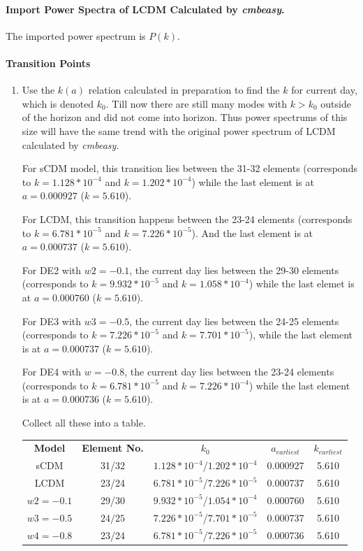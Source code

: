 \documentclass{article}
\begin{document}
\paragraph{Import Power Spectra of LCDM Calculated by {\it cmbeasy}.}

The imported power spectrum is $P(k)$.

\paragraph{Transition Points}
\begin{enumerate}
\item
Use the $k(a)$ relation calculated in preparation to find the $k$ for current day, which is denoted $k_0$. Till now there are still many modes with $k>k_0$ outside of the horizon and did not come into horizon. Thus power spectrums of this size will have the same trend with the original power spectrum of LCDM calculated by {\it cmbeasy}.

For sCDM model, this transition lies between the 31-32 elements (corresponds to $k=1.128*10^{-4}$ and $k=1.202*10^{-4}$) while the last element is at $a=0.000927$ ($k=5.610$).

For LCDM, this transition happens between the 23-24 elements (corresponds to $k=6.781*10^{-5}$ and $k=7.226*10^{-5}$). And the last element is at $a=0.000737$ ($k=5.610$).

For DE2 with $w2=-0.1$, the current day lies between the 29-30 elements (corresponds to $k=9.932*10^{-5}$ and $k=1.058*10^{-4}$) while the last elemet is at $a=0.000760$ ($k=5.610$).

For DE3 with $w3=-0.5$, the current day lies between the 24-25 elements (corresponds to $k=7.226*10^{-5}$ and $k=7.701*10^{-5}$), while the last element is at $a=0.000737$ ($k=5.610$).

For DE4 with $w=-0.8$, the current day lies between the 23-24 elements (corresponds to $k=6.781*10^{-5}$ and $k=7.226*10^{-4}$) while the last element is at $a=0.000736$ ($k=5.610$).

Collect all these into a table.

\begin{center}
\begin{tabular}{ccccc}
{\bf Model}&{\bf Element No.}&{\bf $k_0$}&{\bf $a_{earliest}$}&{\bf $k_{earliest}$}\\
sCDM&31/32&$1.128*10^{-4}$/$1.202*10^{-4}$&0.000927&5.610\\
LCDM&23/24&$6.781*10^{-5}$/$7.226*10^{-5}$&0.000737&5.610 \\
$w2=-0.1$&29/30&$9.932*10^{-5}$/$1.054*10^{-4}$&0.000760&5.610 \\
$w3=-0.5$&$24/25$&$7.226*10^{-5}$/$7.701*10^{-5}$&0.000737&5.610 \\
$w4=-0.8$&23/24&$6.781*10^{-5}$/$7.226*10^{-5}$ &0.000736&5.610
\end{tabular}
\end{center}


\end{enumerate}
\end{document}
